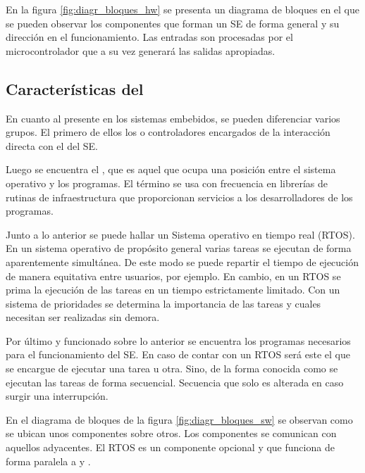 En la figura \ref{fig:diagr_bloques_hw} se presenta un diagrama de bloques
en el que se pueden observar los componentes que forman un SE de forma general
y su dirección en el funcionamiento. Las entradas son procesadas por el
microcontrolador que a su vez generará las salidas apropiadas.

\subsection{Características del }{\label{sec:se-sw}}
En cuanto al  presente en los sistemas embebidos, se
pueden diferenciar varios grupos. El primero de ellos los
 o controladores encargados de la interacción directa
con el  del SE.

Luego se encuentra el , que es aquel
 que ocupa una posición entre el sistema operativo y los
programas. El término se usa con frecuencia en librerías de rutinas de
infraestructura que proporcionan servicios a los desarrolladores de los
programas. \cite{butterfield2016}

Junto a lo anterior se puede hallar un Sistema operativo en tiempo real (RTOS).
En un sistema operativo de propósito general varias tareas se ejecutan de forma
aparentemente simultánea. De este modo se puede repartir el tiempo de ejecución
de manera equitativa entre usuarios, por ejemplo. En cambio, en un RTOS se prima
la ejecución de las tareas en un tiempo estrictamente limitado. Con un sistema
de prioridades se determina la importancia de las tareas y cuales necesitan ser
realizadas sin demora. \cite{webpage:amazon-rtos}

Por último y funcionado sobre lo anterior se encuentra los programas necesarios
para el funcionamiento del SE. En caso de contar con un RTOS será este el que se
encargue de ejecutar una tarea u otra. Sino, de la forma conocida como
 se ejecutan las tareas de forma secuencial. Secuencia
que solo es alterada en caso surgir una interrupción.

En el diagrama de bloques de la figura \ref{fig:diagr_bloques_sw} se observan
como se ubican unos componentes sobre otros. Los componentes se comunican con
aquellos adyacentes. El RTOS es un componente opcional y que funciona de forma
paralela a  y .

